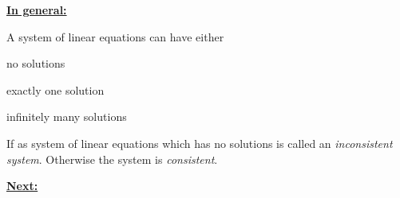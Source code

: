 \newpage

\underline{\bf In general:}

\vskip 3mm

A system of linear equations can have either
\bitem
\item no solutions\\[-4mm]
\item exactly one solution\\[-4mm]
\item infinitely many solutions
\eitem

\vskip 10mm

\begin{cbox}[Definition]
If as system of linear equations which has no solutions is called an \emph{inconsistent system}. 
Otherwise the system is \emph{consistent}.
\end{cbox}


\newpage





\underline{\bf Next:}


